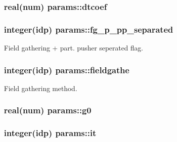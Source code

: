 \subsubsection[{\texorpdfstring{dtcoef}{dtcoef}}]{\setlength{\rightskip}{0pt plus 5cm}real(num) params\+::dtcoef}\hypertarget{namespaceparams_a565cff6b9c99bcab68c1ae3af5f03d9e}{}\label{namespaceparams_a565cff6b9c99bcab68c1ae3af5f03d9e}
\subsubsection[{\texorpdfstring{fg\+\_\+p\+\_\+pp\+\_\+separated}{fg_p_pp_separated}}]{\setlength{\rightskip}{0pt plus 5cm}integer(idp) params\+::fg\+\_\+p\+\_\+pp\+\_\+separated}\hypertarget{namespaceparams_a041d5cfcf8653c0bd7eacd2e48077d42}{}\label{namespaceparams_a041d5cfcf8653c0bd7eacd2e48077d42}


Field gathering + part. pusher seperated flag. 

\subsubsection[{\texorpdfstring{fieldgathe}{fieldgathe}}]{\setlength{\rightskip}{0pt plus 5cm}integer(idp) params\+::fieldgathe}\hypertarget{namespaceparams_afef819010f4c590b2d6f9ecde05bd4c5}{}\label{namespaceparams_afef819010f4c590b2d6f9ecde05bd4c5}


Field gathering method. 

\subsubsection[{\texorpdfstring{g0}{g0}}]{\setlength{\rightskip}{0pt plus 5cm}real(num) params\+::g0}\hypertarget{namespaceparams_af27554c70c98a90a2d5fbd7a4083f366}{}\label{namespaceparams_af27554c70c98a90a2d5fbd7a4083f366}
\subsubsection[{\texorpdfstring{it}{it}}]{\setlength{\rightskip}{0pt plus 5cm}integer(idp) params\+::it}\hypertarget{namespaceparams_aa53b49f79463d25c9fe7a51e6b990067}{}\label{namespaceparams_aa53b49f79463d25c9fe7a51e6b990067}


